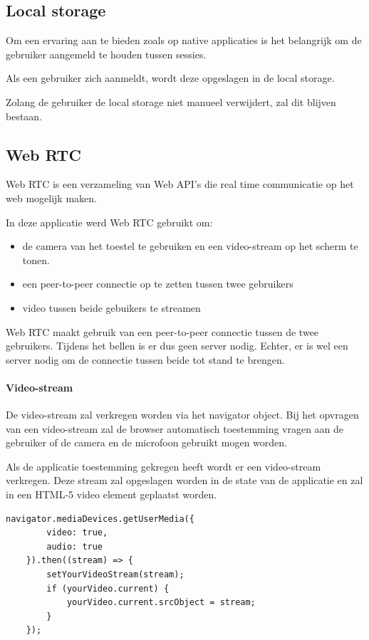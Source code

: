 	\subsection{Local storage}
		
		Om een ervaring aan te bieden zoals op native applicaties is het belangrijk om de gebruiker aangemeld te houden tussen sessies.
		
		Als een gebruiker zich aanmeldt, wordt deze opgeslagen in de local storage.
		
		Zolang de gebruiker de local storage niet manueel verwijdert, zal dit blijven bestaan. 
		\autocite{Mozilla2020d}
		
	\subsection{Web RTC}
		
		Web RTC is een verzameling van Web API's die real time communicatie  op het web mogelijk maken. 
		
		In deze applicatie werd Web RTC gebruikt om:
		\begin{itemize}
			\item de camera van het toestel te gebruiken en een video-stream op het scherm te tonen.
			\item een peer-to-peer connectie op te zetten tussen twee gebruikers
			\item video tussen beide gebuikers te streamen
		\end{itemize} 
		\autocite{webRTC2020}
		
		Web RTC maakt gebruik van een peer-to-peer connectie tussen de twee gebruikers. Tijdens het bellen is er dus geen server nodig. Echter, er is wel een server nodig om de connectie tussen beide tot stand te brengen.
		
		\paragraph{Video-stream}
			De video-stream zal verkregen worden via het navigator object. Bij het opvragen van een video-stream zal de browser automatisch toestemming vragen aan de gebruiker of de camera en de microfoon gebruikt mogen worden.
			
			Als de applicatie toestemming gekregen heeft wordt er een video-stream verkregen.
			Deze stream zal opgeslagen worden in de state van de applicatie en zal in een HTML-5 video element geplaatst worden.
		
\begin{lstlisting}
navigator.mediaDevices.getUserMedia({ 
		video: true,
		audio: true 
	}).then((stream) => {
		setYourVideoStream(stream);
		if (yourVideo.current) {
			yourVideo.current.srcObject = stream;
		}
	});
\end{lstlisting}


